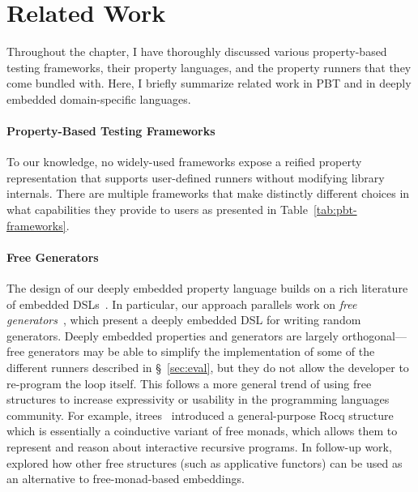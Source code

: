 \section{Related Work}\label{sec:related}

Throughout the chapter, I have thoroughly discussed various property-based testing
frameworks, their property languages, and the property runners that they come bundled
with. Here, I briefly summarize related work in PBT and in deeply embedded
domain-specific languages.

\paragraph{Property-Based Testing Frameworks}

To our knowledge, no widely-used frameworks expose a reified property representation
that supports user-defined runners without modifying library internals. There are
multiple frameworks that make distinctly different choices in what capabilities they
provide to users as presented in Table~\ref{tab:pbt-frameworks}.

\paragraph{Free Generators}

The design of our deeply embedded property language builds on a rich literature of
embedded DSLs~\cite{hudakBuildingDomainspecificEmbedded1996}. In particular, our
approach parallels work on {\em free generators}~\cite{goldsteinParsingRandomness2022},
which present a deeply embedded DSL for writing random generators. Deeply embedded
properties and generators are largely orthogonal---free generators may be able to
simplify the implementation of some of the different runners described in
\S~\ref{sec:eval}, but they do not allow the developer to re-program the loop itself.
%
This follows a more general trend of using free structures to increase expressivity or
usability in the programming languages community. For example,
itrees~\cite{DBLP:journals/pacmpl/XiaZHHMPZ20} introduced a general-purpose Rocq
structure which is essentially a coinductive variant of free monads, which allows them
to represent and reason about interactive recursive programs. In follow-up work,
\citet{DBLP:journals/pacmpl/LiW22} explored how other free structures (such as
applicative functors) can be used as an alternative to free-monad-based embeddings.

